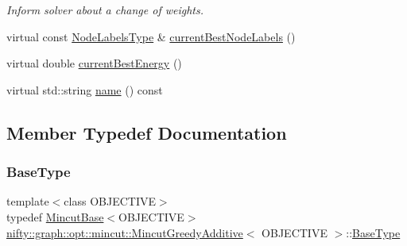 \begin{DoxyCompactItemize}
\begin{DoxyCompactList}\small\item\em Inform solver about a change of weights. \end{DoxyCompactList}\item 
virtual const \hyperlink{classnifty_1_1graph_1_1opt_1_1mincut_1_1MincutGreedyAdditive_a5a8855589a1e752e63650d8e678fc162}{Node\+Labels\+Type} \& \hyperlink{classnifty_1_1graph_1_1opt_1_1mincut_1_1MincutGreedyAdditive_a90776c1d69e006d6503007d8c870896b}{current\+Best\+Node\+Labels} ()
\item 
virtual double \hyperlink{classnifty_1_1graph_1_1opt_1_1mincut_1_1MincutGreedyAdditive_ab18457f6010006ecfc156f26277e9316}{current\+Best\+Energy} ()
\item 
virtual std\+::string \hyperlink{classnifty_1_1graph_1_1opt_1_1mincut_1_1MincutGreedyAdditive_a2a3351733ab0dc823eb35947c92fa227}{name} () const
\end{DoxyCompactItemize}


\subsection{Member Typedef Documentation}
\mbox{\label{classnifty_1_1graph_1_1opt_1_1mincut_1_1MincutGreedyAdditive_a2f1009590b7ee06e4b15ed0b94c658a0}} 
\subsubsection{\texorpdfstring{Base\+Type}{BaseType}}
{\footnotesize\ttfamily template$<$class O\+B\+J\+E\+C\+T\+I\+VE$>$ \\
typedef \hyperlink{classnifty_1_1graph_1_1opt_1_1mincut_1_1MincutBase}{Mincut\+Base}$<$O\+B\+J\+E\+C\+T\+I\+VE$>$ \hyperlink{classnifty_1_1graph_1_1opt_1_1mincut_1_1MincutGreedyAdditive}{nifty\+::graph\+::opt\+::mincut\+::\+Mincut\+Greedy\+Additive}$<$ O\+B\+J\+E\+C\+T\+I\+VE $>$\+::\hyperlink{classnifty_1_1graph_1_1opt_1_1mincut_1_1MincutGreedyAdditive_a2f1009590b7ee06e4b15ed0b94c658a0}{Base\+Type}}

\mbox{\label{classnifty_1_1graph_1_1opt_1_1mincut_1_1MincutGreedyAdditive_acfb227c3e34c4295ae909fcf0ecbccf1}} 

